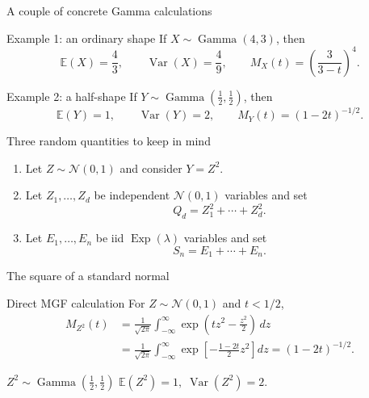 \documentclass[aspectratio=169,11pt]{beamer}
\newcommand{\E}{\mathbb{E}}
\newcommand{\Var}{\operatorname{Var}}
\newcommand{\GammaDist}{\operatorname{Gamma}}
\newcommand{\Exp}{\operatorname{Exp}}
\newcommand{\Normal}{\mathcal{N}}
\begin{document}
\begin{frame}{A couple of concrete Gamma calculations}
  \begin{exampleblock}{Example 1: an ordinary shape}
    If $X\sim\GammaDist(4,3)$, then
    \[
      \E(X)=\frac43,\qquad \Var(X)=\frac49,
      \qquad M_X(t)=\left(\frac{3}{3-t}\right)^4.
    \]
  \end{exampleblock}
  \begin{exampleblock}{Example 2: a half-shape}
    If $Y\sim\GammaDist\!\left(\tfrac12,\tfrac12\right)$, then
    \[
      \E(Y)=1,\qquad \Var(Y)=2,
      \qquad M_Y(t)=(1-2t)^{-1/2}.
    \]
  \end{exampleblock}
\end{frame}

\begin{frame}{Three random quantities to keep in mind}
  \begin{enumerate}
    \item Let $Z\sim\Normal(0,1)$ and consider $Y=Z^2$.
    \item Let $Z_1,\dots,Z_d$ be independent $\Normal(0,1)$ variables and set
      \[
        Q_d=Z_1^2+\cdots+Z_d^2.
      \]
    \item Let $E_1,\dots,E_n$ be iid $\Exp(\lambda)$ variables and set
      \[
        S_n=E_1+\cdots+E_n.
      \]
  \end{enumerate}
\end{frame}

\begin{frame}{The square of a standard normal}
  \begin{block}{Direct MGF calculation}
    For $Z\sim\Normal(0,1)$ and $t<1/2$,
    \[
      \begin{aligned}
      M_{Z^2}(t)
      &=\frac{1}{\sqrt{2\pi}}\int_{-\infty}^{\infty}
        \exp\!\left(tz^2-\frac{z^2}{2}\right)\,dz\\
      &=\frac{1}{\sqrt{2\pi}}\int_{-\infty}^{\infty}
        \exp\!\left[-\frac{1-2t}{2}z^2\right]dz
      =(1-2t)^{-1/2}.
      \end{aligned}
    \]
  \end{block}
  \centering
  \Large $Z^2\sim\GammaDist\!\left(\tfrac12,\tfrac12\right)$
  \qquad
  \small $\E(Z^2)=1,\;\Var(Z^2)=2$.
\end{frame}
\end{document}

